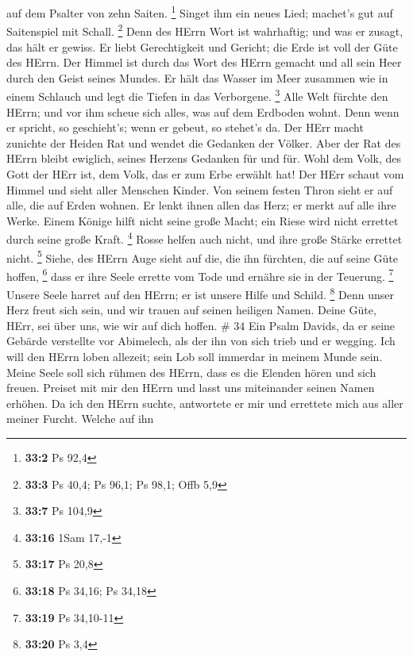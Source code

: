 auf dem Psalter von zehn Saiten. \footnote{\textbf{33:2} Ps 92,4}
 Singet ihm ein neues Lied; machet's gut auf Saitenspiel mit
Schall. \footnote{\textbf{33:3} Ps 40,4; Ps 96,1; Ps 98,1; Offb 5,9}
 Denn des HErrn Wort ist wahrhaftig; und was er zusagt, das
hält er gewiss.  Er liebt Gerechtigkeit und Gericht; die
Erde ist voll der Güte des HErrn.  Der Himmel ist durch das
Wort des HErrn gemacht und all sein Heer durch den Geist seines Mundes.
 Er hält das Wasser im Meer zusammen wie in einem Schlauch
und legt die Tiefen in das Verborgene. \footnote{\textbf{33:7} Ps 104,9}
 Alle Welt fürchte den HErrn; und vor ihm scheue sich alles,
was auf dem Erdboden wohnt.  Denn wenn er spricht, so
geschieht's; wenn er gebeut, so stehet's da.  Der HErr
macht zunichte der Heiden Rat und wendet die Gedanken der Völker.
 Aber der Rat des HErrn bleibt ewiglich, seines Herzens
Gedanken für und für.  Wohl dem Volk, des Gott der HErr
ist, dem Volk, das er zum Erbe erwählt hat!  Der HErr
schaut vom Himmel und sieht aller Menschen Kinder.  Von
seinem festen Thron sieht er auf alle, die auf Erden wohnen.
 Er lenkt ihnen allen das Herz; er merkt auf alle ihre
Werke.  Einem Könige hilft nicht seine große Macht; ein
Riese wird nicht errettet durch seine große Kraft. \footnote{\textbf{33:16}
  1Sam 17,-1}  Rosse helfen auch nicht, und ihre große
Stärke errettet nicht. \footnote{\textbf{33:17} Ps 20,8} 
Siehe, des HErrn Auge sieht auf die, die ihn fürchten, die auf seine
Güte hoffen, \footnote{\textbf{33:18} Ps 34,16; Ps 34,18} 
dass er ihre Seele errette vom Tode und ernähre sie in der Teuerung.
\footnote{\textbf{33:19} Ps 34,10-11}  Unsere Seele harret
auf den HErrn; er ist unsere Hilfe und Schild. \footnote{\textbf{33:20}
  Ps 3,4}  Denn unser Herz freut sich sein, und wir trauen
auf seinen heiligen Namen.  Deine Güte, HErr, sei über uns,
wie wir auf dich hoffen. \# 34  Ein Psalm Davids, da er
seine Gebärde verstellte vor Abimelech, als der ihn von sich trieb und
er wegging.  Ich will den HErrn loben allezeit; sein Lob
soll immerdar in meinem Munde sein.  Meine Seele soll sich
rühmen des HErrn, dass es die Elenden hören und sich freuen.
 Preiset mit mir den HErrn und lasst uns miteinander seinen
Namen erhöhen.  Da ich den HErrn suchte, antwortete er mir
und errettete mich aus aller meiner Furcht.  Welche auf ihn
